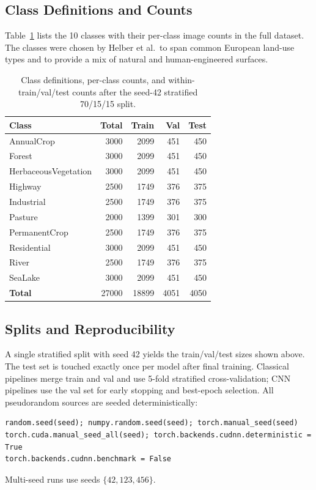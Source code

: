 \documentclass[10pt,letterpaper]{article}
\begin{document}
\subsection{Class Definitions and Counts}
Table~\ref{tab:classes} lists the 10 classes with their per-class image counts in the full dataset. The classes were chosen by Helber et al.\ to span common European land-use types and to provide a mix of natural and human-engineered surfaces.

\begin{table}[h]
\centering
\small
\caption{Class definitions, per-class counts, and within-train/val/test counts after the seed-42 stratified 70/15/15 split.}
\label{tab:classes}
\begin{tabular}{lrrrr}
\toprule
\textbf{Class} & \textbf{Total} & \textbf{Train} & \textbf{Val} & \textbf{Test} \\
\midrule
AnnualCrop           & 3000 & 2099 & 451 & 450 \\
Forest               & 3000 & 2099 & 451 & 450 \\
HerbaceousVegetation & 3000 & 2099 & 451 & 450 \\
Highway              & 2500 & 1749 & 376 & 375 \\
Industrial           & 2500 & 1749 & 376 & 375 \\
Pasture              & 2000 & 1399 & 301 & 300 \\
PermanentCrop        & 2500 & 1749 & 376 & 375 \\
Residential          & 3000 & 2099 & 451 & 450 \\
River                & 2500 & 1749 & 376 & 375 \\
SeaLake              & 3000 & 2099 & 451 & 450 \\
\midrule
\textbf{Total}       & 27000 & 18899 & 4051 & 4050 \\
\bottomrule
\end{tabular}
\end{table}

\subsection{Splits and Reproducibility}
A single stratified split with seed 42 yields the train/val/test sizes shown above. The test set is touched exactly once per model after final training. Classical pipelines merge train and val and use 5-fold stratified cross-validation; CNN pipelines use the val set for early stopping and best-epoch selection. All pseudorandom sources are seeded deterministically:
\begin{verbatim}
random.seed(seed); numpy.random.seed(seed); torch.manual_seed(seed)
torch.cuda.manual_seed_all(seed); torch.backends.cudnn.deterministic = True
torch.backends.cudnn.benchmark = False
\end{verbatim}
Multi-seed runs use seeds $\{42, 123, 456\}$.
\end{document}
